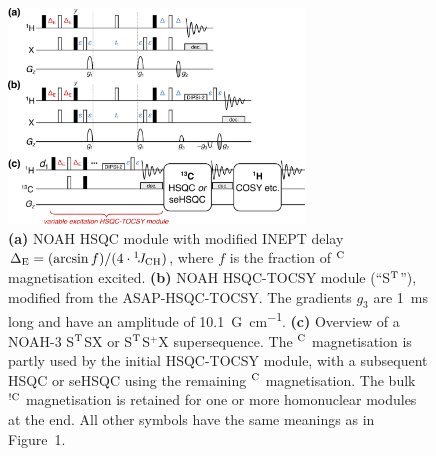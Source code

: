 \documentclass[final,twocolumn]{elsarticle}
\newcommand*{\noahS}{S}
\newcommand*{\noahSp}{S$^+$}
\newcommand*{\noahSt}{S$\rm ^T$}
\newcommand*{\noahX}{X}
\newcommand*{\onejch}{{}^{1}\!J_{\ce{CH}}}
\newcommand*{\magn}[1]{\ce{^1H}$^{#1}$}
\newcommand*{\magnnot}[1]{\ce{^1H}$^{!#1}$}
\begin{document}
\begin{figure}[!ht]
    \centering
    \includegraphics[width=0.7\textwidth]{pprogs_hsqct.png}
    \caption{
        \textbf{(a)} NOAH HSQC module with modified INEPT delay $\Delta_{\mathrm{E}} = (\arcsin f)/(4\cdot\onejch)$, where $f$ is the fraction of \magn{\ce{C}} magnetisation excited.
        \textbf{(b)} NOAH HSQC-TOCSY module (``\noahSt{}''), modified from the ASAP-HSQC-TOCSY.\cite{Becker2019JMR}
        The gradients $g_3$ are \SI{1}{\ms} long and have an amplitude of \SI{10.1}{G\per\cm}.
        \textbf{(c)} Overview of a NOAH-3 \noahSt{}\noahS{}\noahX{} or \noahSt{}\noahSp{}\noahX{} supersequence.
        The \magn{\ce{C}} magnetisation is partly used by the initial HSQC-TOCSY module, with a subsequent HSQC or seHSQC using the remaining \magn{\ce{C}} magnetisation.
        The bulk \magnnot{\ce{C}} magnetisation is retained for one or more homonuclear modules at the end.
        All other symbols have the same meanings as in Figure~1.
    }
    \label{fig:pprogs_hsqct}
\end{figure}
\end{document}

